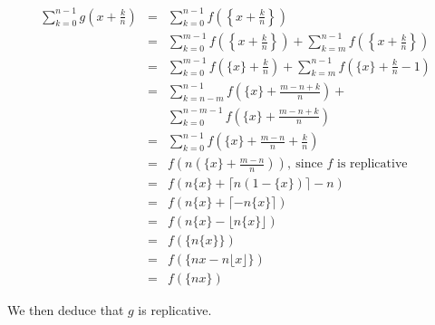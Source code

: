 \documentclass[a4paper,12pt]{article}
\begin{document}
\begin{eqnarray*}
  \sum_{k=0}^{n-1}g\left(x+\frac{k}{n}\right) &=&
  \sum_{k=0}^{n-1}f\left(\left\{x+\frac{k}{n}\right\}\right) \\
  &=&   \sum_{k=0}^{m-1}f\left(\left\{x+\frac{k}{n}\right\}\right) +
  \sum_{k=m}^{n-1}f\left(\left\{x+\frac{k}{n}\right\}\right) \\
  &=& \sum_{k=0}^{m-1}f\left(\{x\} + \frac{k}{n}\right) +
  \sum_{k=m}^{n-1}f\left(\{x\}+\frac{k}{n}-1\right) \\
  &=& \sum_{k=n-m}^{n-1}f\left(\{x\}+\frac{m-n+k}{n}\right) +\\
  &&\sum_{k=0}^{n-m-1}f\left(\{x\} + \frac{m-n+k}{n}\right) \\
  &=& \sum_{k=0}^{n-1}f\left(\{x\}+\frac{m-n}{n} + \frac{k}{n}\right)
  \\
  &=& f\left(n\left(\{x\} + \frac{m -
    n}{n}\right)\right),\ \mbox{since $f$ is replicative} \\
  &=& f(n\{x\} + \lceil n(1-\{x\})\rceil - n ) \\
  &=& f(n\{x\} + \lceil - n\{x\}\rceil) \\
  &=& f(n\{x\} - \lfloor n\{x\}\rfloor) \\
  &=& f(\{n\{x\}\}) \\
  &=& f(\{nx - n\lfloor x\rfloor\}) \\
  &=& f(\{nx\})
\end{eqnarray*}

We then deduce that $g$ is replicative.
\end{document}
